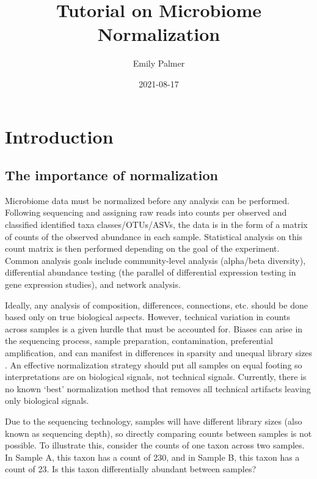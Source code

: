 \documentclass[
]{book}
\title{Tutorial on Microbiome Normalization}
\author{Emily Palmer}
\date{2021-08-17}
\begin{document}
\maketitle

{
\setcounter{tocdepth}{1}
\tableofcontents
}
\hypertarget{intro}{%
\chapter{Introduction}\label{intro}}

\hypertarget{the-importance-of-normalization}{%
\section{The importance of normalization}\label{the-importance-of-normalization}}

Microbiome data must be normalized before any analysis can be performed. Following sequencing and assigning raw reads into counts per observed and classified identified taxa classes/OTUs/ASVs, the data is in the form of a matrix of counts of the observed abundance in each sample. Statistical analysis on this count matrix is then performed depending on the goal of the experiment. Common analysis goals include community-level analysis (alpha/beta diversity), differential abundance testing (the parallel of differential expression testing in gene expression studies), and network analysis.

Ideally, any analysis of composition, differences, connections, etc. should be done based only on true biological aspects. However, technical variation in counts across samples is a given hurdle that must be accounted for. Biases can arise in the sequencing process, sample preparation, contamination, preferential amplification, and can manifest in differences in sparsity and unequal library sizes \citep{salter2014}. An effective normalization strategy should put all samples on equal footing so interpretations are on biological signals, not technical signals. Currently, there is no known `best' normalization method that removes all technical artifacts leaving only biological signals.

Due to the sequencing technology, samples will have different library sizes (also known as sequencing depth), so directly comparing counts between samples is not possible. To illustrate this, consider the counts of one taxon across two samples. In Sample A, this taxon has a count of 230, and in Sample B, this taxon has a count of 23. Is this taxon differentially abundant between samples?
\end{document}

